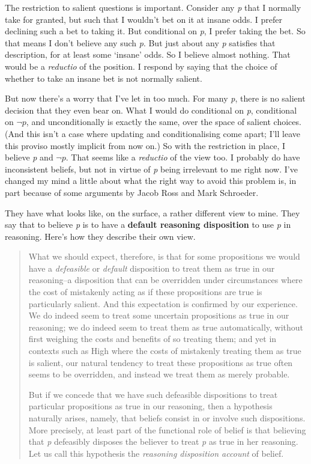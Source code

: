The restriction to salient questions is important. Consider any \emph{p} that I normally take for granted, but such that I wouldn't bet on it at insane odds. I prefer declining such a bet to taking it. But conditional on \emph{p}, I prefer taking the bet. So that means I don't believe any such \emph{p}. But just about any \emph{p} satisfies that description, for at least some `insane' odds. So I believe almost nothing. That would be a \emph{reductio} of the position. I respond by saying that the choice of whether to take an insane bet is not normally salient.

But now there's a worry that I've let in too much. For many \emph{p}, there is no salient decision that they even bear on. What I would do conditional on \emph{p}, conditional on $\neg p$, and unconditionally is exactly the same, over the space of salient choices. (And this isn't a case where updating and conditionalising come apart; I'll leave this proviso mostly implicit from now on.) So with the restriction in place, I believe \emph{p} and $\neg p$. That seems like a \emph{reductio} of the view too. I probably do have inconsistent beliefs, but not in virtue of \emph{p} being irrelevant to me right now. I've changed my mind a little about what the right way to avoid this problem is, in part because of some arguments by Jacob Ross and Mark Schroeder. 

They have what looks like, on the surface, a rather different view to mine. They say that to believe \emph{p} is to have a \textbf{default reasoning disposition} to use \emph{p} in reasoning. Here's how they describe their own view.

\begin{quote}

What we should expect, therefore, is that for some propositions we would have a \emph{defeasible} or \emph{default} disposition to treat them as true in our reasoning--a disposition that can be overridden under circumstances where the cost of mistakenly acting as if these propositions are true is particularly salient. And this expectation is confirmed by our experience. We do indeed seem to treat some uncertain propositions as true in our reasoning; we do indeed seem to treat them as true automatically, without first weighing the costs and benefits of so treating them; and yet in contexts such as High where the costs of mistakenly treating them as true is salient, our natural tendency to treat these propositions as true often seems to be overridden, and instead we treat them as merely probable.

But if we concede that we have such defeasible dispositions to treat particular propositions as true in our reasoning, then a hypothesis naturally arises, namely, that beliefs consist in or involve such dispositions. More precisely, at least part of the functional role of belief is that believing that \emph{p} defeasibly disposes the believer to treat \emph{p} as true in her reasoning. Let us call this hypothesis the \emph{reasoning disposition account} of belief.
\end{quote}

